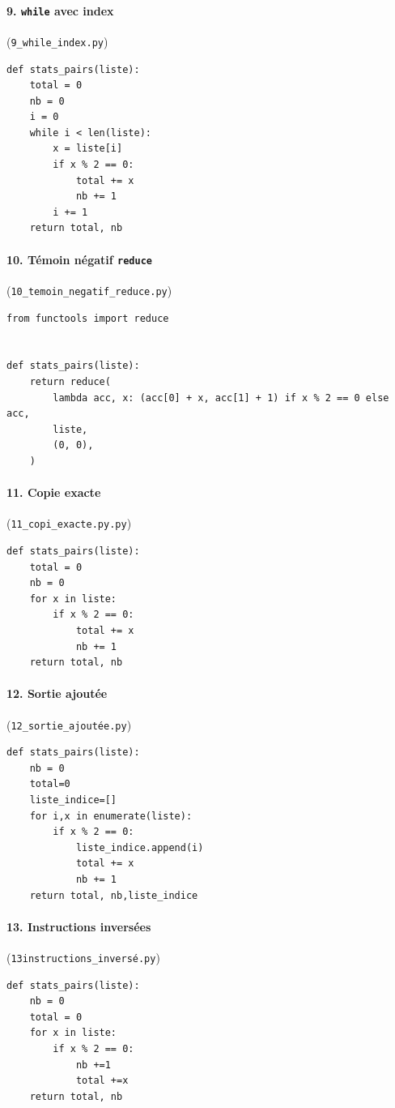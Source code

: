 \documentclass[12pt,a4paper,oneside]{report}
\begin{document}
\paragraph{9. \texttt{while} avec index} (\texttt{9\_while\_index.py})
\begin{lstlisting}[style=pyncst]
def stats_pairs(liste):
    total = 0
    nb = 0
    i = 0
    while i < len(liste):
        x = liste[i]
        if x % 2 == 0:
            total += x
            nb += 1
        i += 1
    return total, nb
\end{lstlisting}

\paragraph{10. Témoin négatif \texttt{reduce}} (\texttt{10\_temoin\_negatif\_reduce.py})
\begin{lstlisting}[style=pyncst]
from functools import reduce


def stats_pairs(liste):
    return reduce(
        lambda acc, x: (acc[0] + x, acc[1] + 1) if x % 2 == 0 else acc,
        liste,
        (0, 0),
    )
\end{lstlisting}

\paragraph{11. Copie exacte} (\texttt{11\_copi\_exacte.py.py})
\begin{lstlisting}[style=pyncst]
def stats_pairs(liste):
    total = 0
    nb = 0
    for x in liste:
        if x % 2 == 0:
            total += x
            nb += 1
    return total, nb
\end{lstlisting}

\paragraph{12. Sortie ajoutée} (\texttt{12\_sortie\_ajoutée.py})
\begin{lstlisting}[style=pyncst]
def stats_pairs(liste):
    nb = 0
    total=0
    liste_indice=[]
    for i,x in enumerate(liste):
        if x % 2 == 0:
            liste_indice.append(i)
            total += x
            nb += 1
    return total, nb,liste_indice
\end{lstlisting}

\paragraph{13. Instructions inversées} (\texttt{13instructions\_inversé.py})
\begin{lstlisting}[style=pyncst]
def stats_pairs(liste):
    nb = 0
    total = 0
    for x in liste:
        if x % 2 == 0:
            nb +=1
            total +=x
    return total, nb
\end{lstlisting}
\end{document}
